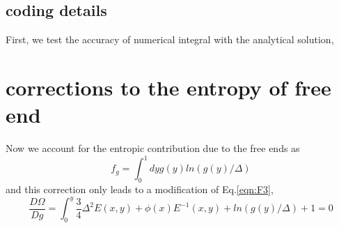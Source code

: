 \documentclass{article}
\begin{document}
\subsection{coding details}
First, we test the accuracy of numerical integral with the analytical solution,









\section{corrections to the entropy of free end}
Now we account for the entropic contribution due to the free ends as
\begin{equation}
 f_g=\int^{1}_{0}dyg(y)ln(g(y)/\Delta)
\end{equation}
and this correction only leads to a modification of Eq.\ref{eqn:F3},
\begin{equation}
 \frac{D\Omega}{Dg}=\int^{y}_{0}\frac{3}{4}\Delta^2E(x,y)+\phi(x)E^{-1}(x,y)+ln(g(y)/\Delta)+1=0
\end{equation}
\end{document}

